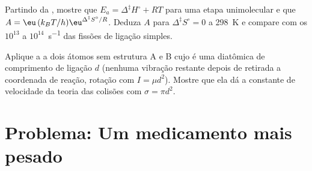 \begin{exercise}[$\star\star\star$]\label{exo:b3:rate-theories:11}
Partindo da , mostre que $E_a = \Delta^{\ddagger}H^\circ + RT$ para uma
etapa unimolecular e que $A = \eu\,(k_BT/h)\eu^{\Delta^{\ddagger}S^\circ/R}$. Deduza $A$ para $\Delta^{\ddagger}S^\circ = 0$ a
\qty{298}{K} e compare com os $10^{13}$ a $10^{14}$~\unit{s^{-1}} das fissões de ligação simples.
\end{exercise}

\begin{exercise}[$\star\star\star$]\label{exo:b3:rate-theories:12}
Aplique a  a dois átomos sem estrutura A e B cujo
 é uma diatômica de comprimento de ligação $d$ (nenhuma vibração
restante depois de retirada a coordenada de reação, rotação com $I = \mu d^2$).
Mostre que ela dá a constante de velocidade da teoria das colisões com $\sigma = \pi d^2$.
\end{exercise}

\section{Problema: Um medicamento mais pesado}

